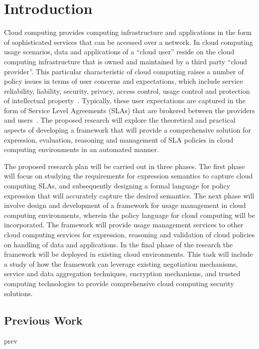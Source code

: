 \documentclass[times, 10pt,twocolumn]{article}
\begin{document}
\section{Introduction}
Cloud computing provides computing infrastructure and applications in the form of sophisticated services that can be accessed over a network. In cloud computing usage scenarios,  data and applications  of a ``cloud user'' reside on the cloud computing infrastructure that is owned and maintained by a third party ``cloud provider''.  This particular characteristic of cloud computing raises a number of policy issues in terms of user concerns and expectations, which include service reliability, liability, security, privacy, access control, usage control and protection of intellectual property~\cite{JeLiGr:08}.  Typically, these user expectations are captured in the form of Service Level Agreements (SLAs) that are brokered between the providers and users~\cite{BuYeVeBrBr:09}. The proposed research will explore the theoretical and practical aspects of developing a framework that will provide a comprehensive solution for expression, evaluation, reasoning and management of SLA policies in cloud computing environments in an automated manner. 

The proposed research plan will be carried out in three phases. The first phase will focus on studying the requirements for expression semantics to capture cloud computing SLAs, and subsequently  designing a formal language for policy expression that will accurately capture the desired semantics. The next phase will involve design and development of a framework for usage management in cloud computing environments, wherein the policy language for cloud computing will be incorporated. The framework will provide usage management services to other cloud computing services for expression, reasoning and validation of cloud policies on handling of data and applications. In the final phase of the research the framework will be deployed in existing cloud environments. This task will include a study of how the framework can leverage existing negotiation mechanisms, service and data aggregation techniques, encryption mechanisms, and  trusted computing technologies  to provide comprehensive cloud computing security solutions. 

\subsection{Previous Work}
prev
\end{document}
